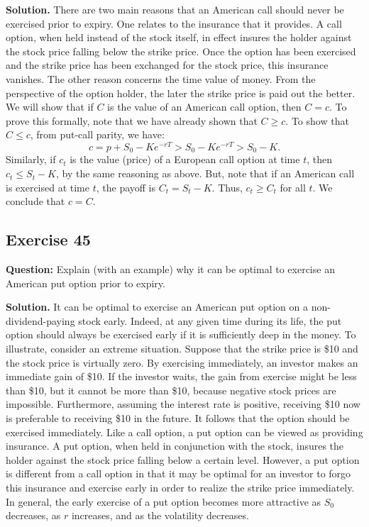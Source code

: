 \documentclass{article}
\begin{document}
\textbf{Solution.} There are two main reasons that an American call should never be exercised prior to expiry. One relates to the insurance that it provides. A call option, when held instead of the stock itself, in effect insures the holder against the stock price falling below the strike price. Once the option has been exercised and the strike price has been exchanged for the stock price, this insurance vanishes. The other reason concerns the time value of money. From the perspective of the option holder, the later the strike price is paid out the better. We will show that if $C$ is the value of an American call option, then $C = c$. To prove this formally, note that we have already shown that $C \geq c$. To show that $C \leq c$, from put-call parity, we have:
\[
c = p + S_0 - Ke^{-rT} > S_0 - Ke^{-rT} > S_0 - K.
\]
Similarly, if $c_t$ is the value (price) of a European call option at time $t$, then $c_t \leq S_t - K$, by the same reasoning as above. But, note that if an American call is exercised at time $t$, the payoff is $C_t = S_t - K$. Thus, $c_t \geq C_t$ for all $t$. We conclude that $c = C$.

\subsection*{Exercise 45}
\textbf{Question:} Explain (with an example) why it can be optimal to exercise an American put option prior to expiry.

\textbf{Solution.} It can be optimal to exercise an American put option on a non-dividend-paying stock early. Indeed, at any given time during its life, the put option should always be exercised early if it is sufficiently deep in the money. To illustrate, consider an extreme situation. Suppose that the strike price is \$10 and the stock price is virtually zero. By exercising immediately, an investor makes an immediate gain of \$10. If the investor waits, the gain from exercise might be less than \$10, but it cannot be more than \$10, because negative stock prices are impossible. Furthermore, assuming the interest rate is positive, receiving \$10 now is preferable to receiving \$10 in the future. It follows that the option should be exercised immediately. Like a call option, a put option can be viewed as providing insurance. A put option, when held in conjunction with the stock, insures the holder against the stock price falling below a certain level. However, a put option is different from a call option in that it may be optimal for an investor to forgo this insurance and exercise early in order to realize the strike price immediately. In general, the early exercise of a put option becomes more attractive as $S_0$ decreases, as $r$ increases, and as the volatility decreases.
\end{document}
